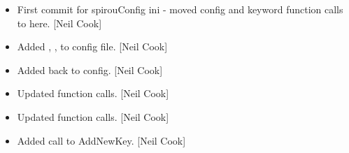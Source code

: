 \documentclass[a4paper,10pt,english]{report}
\begin{document}
\begin{itemize}
\item {} 
First commit for spirouConfig ini - moved config and keyword function
calls to here. {[}Neil Cook{]}

\item {} 
Added , ,  to config file. {[}Neil
Cook{]}

\item {} 
Added  back to config. {[}Neil Cook{]}

\item {} 
Updated function calls. {[}Neil Cook{]}

\item {} 
Updated function calls. {[}Neil Cook{]}

\item {} 
Added call to AddNewKey. {[}Neil Cook{]}

\end{itemize}
\end{document}
